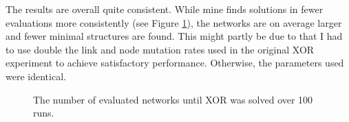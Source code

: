 The results are overall quite consistent. While mine finds solutions in fewer evaluations more consistently (see Figure \ref{evals}),
the networks are on average larger and fewer minimal structures are found. This might partly be due to that
I had to use double the link and node mutation rates used in the original XOR experiment
to achieve satisfactory performance. Otherwise, the parameters used were identical.


\begin{figure}
    \centering
    
    \caption{The number of evaluated networks until XOR was solved over 100 runs.}
    \label{evals}
\end{figure}
